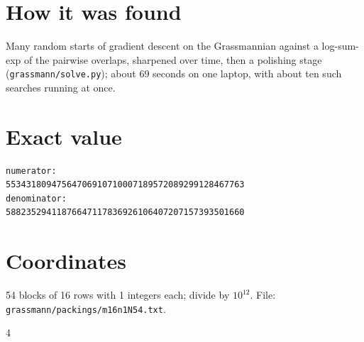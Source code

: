 \documentclass[11pt,a4paper]{article}
\begin{document}
\section{How it was found}
Many random starts of gradient descent on the Grassmannian against a log-sum-exp of the pairwise overlaps, sharpened over time, then a polishing stage (\texttt{grassmann/solve.py}); about 69 seconds on one laptop, with about ten such searches running at once.


\appendix
\section{Exact value}
{\small
\begin{verbatim}
numerator:
55343180947564706910710007189572089299128467763
denominator:
58823529411876647117836926106407207157393501660
\end{verbatim}}

\section{Coordinates}
54 blocks of 16 rows with 1 integers each; divide by $10^{12}$. File: \texttt{grassmann/packings/m16n1N54.txt}.
{\tiny
\begin{multicols}{4}
\end{multicols}}
\end{document}

